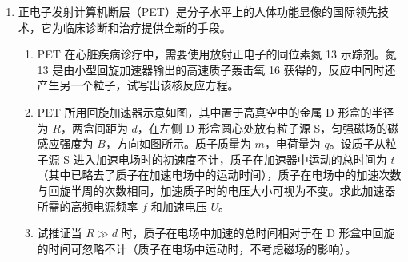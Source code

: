 \documentclass[\gkver]{gaokaozhenti}
\begin{document}
\begin{enumerate}
{$-\left(F_{BA}+F_{CA}\right)t=mv_{A}-m_{A}v_{0}$ ③

$F_{AB}t=m_{B}v_{B}$ ④

其中 $F_{AB}=F_{BA}$

$F_{CA}=\mu(m_{A}+m_{C})g$ ⑤

设 A、B 相对于 C 的位移大小分别为 $s_{A}$ 和 $s_{B}$，有

$-\left(F_{BA}+F_{CA}\right)s_{A}=mv_{A}^{2}/2-m_{A}v_{0}^{2}/2$ ⑥

$F_{AB}s_{B}=E_{KB}$ ⑦

动量和动能之间的关系为：$m_{A}v_{A}=\sqrt{2m_{A}E_{KA}}$ ⑧

$m_{A}v_{A}=\sqrt{2m_{A}E_{KA}}$ ⑨

木板 A 的长度：$L=s_{A}-s_{B}$ ⑩

代入数据得：$L=0.50\Um$
}

\item
正电子发射计算机断层（PET）是分子水平上的人体功能显像的国际领先技术，它为临床诊断和治疗提供全新的手段。

\begin{enumerate}
	\item
	PET 在心脏疾病诊疗中，需要使用放射正电子的同位素氮 13 示踪剂。氮 13 是由小型回旋加速器输出的高速质子轰击氧 16 获得的，反应中同时还产生另一个粒子，试写出该核反应方程。
	\item
	PET 所用回旋加速器示意如图，其中置于高真空中的金属 D 形盒的半径为 $R$，两盒间距为 $d$，在左侧 D 形盒圆心处放有粒子源 S，匀强磁场的磁感应强度为 $B$，方向如图所示。质子质量为 $m$，电荷量为 $q$。设质子从粒子源 S 进入加速电场时的初速度不计，质子在加速器中运动的总时间为 $t$（其中已略去了质子在加速电场中的运动时间），质子在电场中的加速次数与回旋半周的次数相同，加速质子时的电压大小可视为不变。求此加速器所需的高频电源频率 $f$ 和加速电压 $U$。
	\item
	试推证当 $R\gg d$ 时，质子在电场中加速的总时间相对于在 D 形盒中回旋的时间可忽略不计（质子在电场中运动时，不考虑磁场的影响）。
\end{enumerate}


\end{enumerate}
\end{document}
